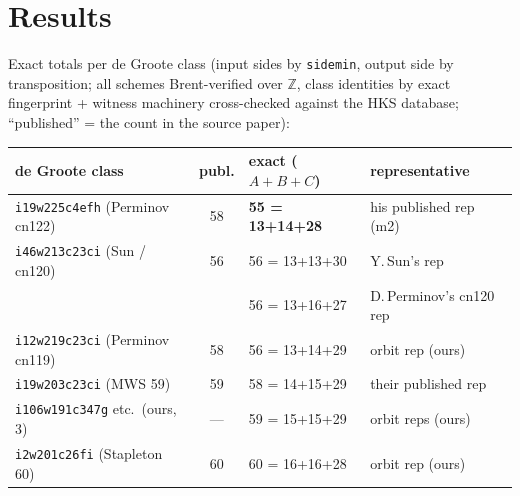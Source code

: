 \documentclass[10pt]{article}
\begin{document}
\section{Results}\label{sec:results}

Exact totals per de Groote class (input sides by \texttt{sidemin},
output side by transposition; all schemes Brent-verified over
$\mathbb{Z}$, class identities by exact fingerprint + witness machinery
cross-checked against the HKS database; ``published'' = the count in
the source paper):

\begin{center}
\small
\begin{tabular}{@{}l c l l@{}}
\toprule
de Groote class & publ. & exact ($A{+}B{+}C$) & representative \\
\midrule
\texttt{i19w225c4efh} (Perminov cn122) & 58 &
  \textbf{55 = 13+14+28} & his published rep (m2) \\
\texttt{i46w213c23ci} (Sun / cn120) & 56 & 56 = 13+13+30 &
  Y.\,Sun's rep \\
 & & 56 = 13+16+27 & D.\,Perminov's cn120 rep \\
\texttt{i12w219c23ci} (Perminov cn119) & 58 & 56 = 13+14+29 &
  orbit rep (ours) \\
\texttt{i19w203c23ci} (MWS 59) & 59 & 58 = 14+15+29 &
  their published rep \\
\texttt{i106w191c347g} etc.\ (ours, 3) & --- & 59 = 15+15+29 &
  orbit reps (ours) \\
\texttt{i2w201c26fi} (Stapleton 60) & 60 & 60 = 16+16+28 &
  orbit rep (ours) \\
\bottomrule
\end{tabular}
\end{center}
\end{document}

